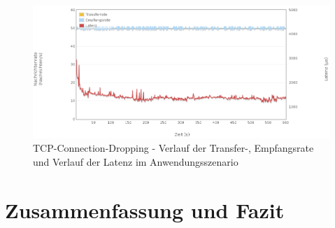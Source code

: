 \documentclass[	a4paper,
			11pt,
			titlepage,
			oneside,
			fleqn,
			listof=totoc,
			parskip,
			numbers=noenddot]{scrartcl}
\begin{document}
		\begin{figure}[!htb]
			\centering
			\includegraphics[width=\textwidth]{img/tcpdrop/tcpdrop_scenario.png}
			\caption{TCP-Connection-Dropping - Verlauf der Transfer-, Empfangsrate und Verlauf der Latenz im Anwendungsszenario}
			\label{fig:tcpdrop-scenario}
		\end{figure}
		
		
		

\clearpage
\section*{Zusammenfassung und Fazit}
\end{document}
